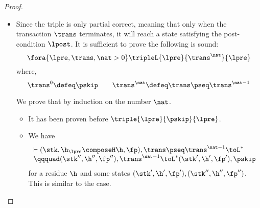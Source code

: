 \begin{proof}
\begin{itemize}
\item {}
Since the triple is only partial correct, 
meaning that only when the transaction \( \trans \) terminates, it will reach a state satisfying the post-condition \( \lpost \).
It is sufficient to prove the following is sound:
\[
    \fora{\lpre, \trans, \nat > 0} \tripleL{\lpre}{\trans^{\nat}}{\lpre}
\]
where,
\[
    \trans^{0} \defeq  \pskip \qquad
    \trans^{\nat} \defeq  \trans \pseq \trans^{\nat - 1} 
\]

We prove that by induction on the number \( \nat \).
\begin{itemize}
    \item {} It has been proven before \( \triple{\lpre}{\pskip}{\lpre} \).
    \item {} We have 
    \[ 
        \begin{array}{l}
        \vdash (\stk, \h_\lpre \composeH \h, \fp), \trans \pseq \trans^{\nat - 1} \toL^{*} \\
        \qqquad (\stk'', \h'', \fp''), \trans^{\nat - 1} \toL^{*} (\stk', \h', \fp'), \pskip  
        \end{array}
    \]
    for a residue \( \h \) and some states \( ( \stk', \h', \fp' ), ( \stk'', \h'', \fp'' ) \).
    This is similar to the  case.
\end{itemize}


\end{itemize}
\end{proof}
